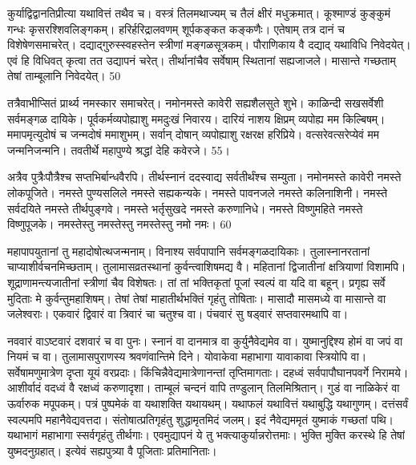 कुर्याद्विद्वानतिप्रीत्या यथावित्तं तथैव च।
वस्त्रं तिलमथाज्यम् च तैलं क्षीरं मधुक्रमात्।
कूश्माण्डं कुङ्कुमं गन्धः कृसरश्शिवलिङ्गकम्।
हरिर्हरिद्रालवणम् शूर्पकङ्कत कङ्कणैः।
एतेषाम् तत्र दानं च विशेषेणसमाचरेत्।
दद्याद्गुरुस्स्वहस्तेन स्त्रीणां मङ्गळसूत्रकम्।
पौराणिकाय वै दद्याद् यथाविधि निवेदयेत्।
एवं हि विधिवत् कृत्वा तत उद्यापनं चरेत्।
तीर्थानांचैव सर्वेषाम् स्थितानां सह्यजाजले।
मासान्ते गच्छताम् तेषां ताम्बूलानि निवेदयेत्।
50

तत्रैवाभीप्सितं प्रार्थ्य नमस्कार समाचरेत्।
नमोनमस्ते कावेरी सह्यशैलसुते शुभे।
काळिन्दी सखसर्वेशी सर्वमङ्गळ दायिके।
पूर्वकर्मव्यपोह्याशु ममदुःखं निवारय।
दारियं नाशय क्षिप्रम् व्यपोह्य मम किल्बिषम्।
ममापमृत्युदोषं च जन्मदोषं ममाशुभम्।
सर्वान् दोषान् व्यपोह्याशु रक्षरक्ष हरिप्रिये।
वत्सरेवत्सरेप्येवं मम जन्मनिजन्मनि।
तवतीर्थे महापुण्ये श्रद्धां देहि कवेरजे।
55।



अत्रैव पुत्रैःपौत्रैश्च सप्तभिर्बान्धवैरपि।
तीर्थस्नानं ददस्वाद्य सर्वतीर्थंश्च सम्युता।
नमोनमस्ते कावेरी नमस्ते लोकपूजिते।
नमस्ते पुण्यसलिले नमस्ते सह्यकन्यके।
नमस्ते पावनजले नमस्ते कलिनाशिनी।
नमस्ते सर्वदयिते नमस्ते तीर्थपुङ्गवे।
नमस्ते भर्तृसुखदे नमस्ते करुणानिधे।
नमस्ते विष्णुमहिते नमस्ते विष्णुपूजके।
नमस्तेस्तु नमस्तेस्तु नमस्तेस्तु नमो नमः।
60

महापापयुतानां तु महादोषोत्थजन्मनाम्।
विनाश्य सर्वपापानि सर्वमङ्गळदायिकाः।
तुलास्नानरतानां चाप्याशीर्वचनमिच्छताम्।
तुलामासव्रतस्थानां कुर्वन्त्वाशिषमद्य वै।
महितानां द्विजातीनां क्षत्रियाणां विशामपि।
शूद्राणामन्त्यजातीनां स्त्रीणां चैव विशेषतः।
तां तां भक्तिकृतां पूजां स्वल्पं वा यदि वा बहून्।
प्रगृह्य सर्वे मुदिताः मे कुर्वन्तुमहाशिषम्।
तेषां तेषां माहातीर्थभक्तिं गृहंतु तोषिताः।
मासादौ मासमध्ये वा मासान्ते वा जलेश्वराः।
एकवारं द्विवारं वा त्रिवारं चा चतुश्च वा।
पंचवारं सु षड्वारं सप्तवारमथापि वा।

नववारं वाऽष्टवारं दशवारं च वा पुनः।
स्नानं वा दानमात्र वा कुर्युनैवेद्यमेव वा।
युष्मानुद्दिश्य होमं वा जपं वा नियमं च वा।
तुलामासपुराणस्य श्रवणंवान्तिमे दिने।
योवाकेवा महाभागा यावाकावा स्त्रियोपि वा।
सर्वेषामणुमात्रेण दृप्ता यूयं वरप्रदाः।
किंचिन्नैवेद्यमात्रेणानन्तां तृप्तिमागताः।
दहध्वं सर्वपापौघानपवर्गे निरामये।
आशीर्वादं वदध्वं वै रक्षध्वं करुणादृशा।
ताम्बूलं चन्दनं वापि तण्डुलान् तिलमिश्रितान्।
गुडं वा नाळिकेरं वा ऊर्वारुक मपूपकम्।
पत्रं पुष्पमेकं वा यथाशक्ति यथायथम्।
यथाफलं यथावित्तं यथाबुद्धि यथागुणम्।
दत्तंसर्वं स्वल्पमपि महानैवेद्यवत्तदा।
संतोषात्प्रतिगृहंतु शुद्धामृतमिदं जलम्।
इदं नैवेद्यममृतं युष्माकं गच्छतां पथि।
यथाभागं महाभागा स्सर्वगृहंतु तीर्थगाः।
एवमुद्यापनं ये तु भक्त्याकुर्यान्नरोत्तमाः।
भुक्ति मुक्ति करस्थे हि तेषां युष्मदनुग्रहात्।
इत्येवं सह्यपुत्र्या वै पूजिताः प्रतिमानिताः।


